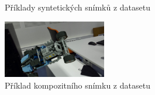 \begin{figure}[ht]
\hspace{\hspacesize}%
\hspace{\hspacesize}%
\subfloat{%
  \hspace{\imagewidth}
}

\caption[Příklady syntetických snímků z datasetu]{Příklady syntetických snímků z datasetu}
\label{fig:synthetic_images}
\end{figure}


\begin{figure}[hb]
\centering
\includegraphics[width=0.4\textwidth,keepaspectratio]{Figures/train_EA408_199.png}
\caption{Příklad kompozitního snímku z datasetu}
\label{fig:trainimg}
\end{figure}